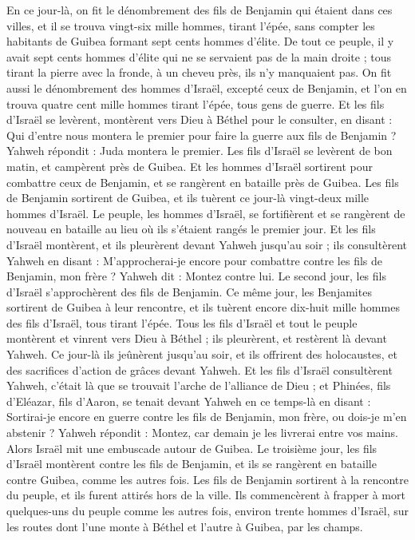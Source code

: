 \begin{multicols}{2}
En ce jour-là, on fit le dénombrement des fils de Benjamin qui étaient dans ces villes, et il se trouva vingt-six mille hommes, tirant l'épée, sans compter les habitants de Guibea formant sept cents hommes d'élite.
De tout ce peuple, il y avait sept cents hommes d'élite qui ne se servaient pas de la main droite ; tous tirant la pierre avec la fronde,  à un cheveu près,  ils n'y manquaient pas.
On fit aussi le dénombrement des hommes d'Israël, excepté ceux de Benjamin, et l'on en trouva quatre cent mille hommes tirant l'épée, tous gens de guerre.
Et les fils d'Israël se levèrent, montèrent vers Dieu à Béthel pour le consulter, en disant : Qui d'entre nous montera le premier pour faire la guerre aux fils de Benjamin ? Yahweh répondit : Juda montera le premier.
Les fils d'Israël se levèrent de bon matin, et campèrent près de Guibea.
Et les hommes d'Israël sortirent pour combattre ceux de Benjamin, et se rangèrent en bataille près de Guibea.
Les fils de Benjamin sortirent de Guibea, et ils tuèrent ce jour-là vingt-deux mille hommes d'Israël.
Le peuple, les hommes d'Israël, se fortifièrent et se rangèrent de nouveau en bataille au lieu où ils s'étaient rangés le premier jour.
Et les fils d'Israël montèrent, et ils pleurèrent devant Yahweh jusqu'au soir ; ils consultèrent Yahweh en disant : M'approcherai-je encore pour combattre contre les fils de Benjamin, mon frère ? Yahweh dit : Montez contre lui.
Le second jour, les fils d'Israël s'approchèrent des fils de Benjamin.
Ce même jour, les Benjamites sortirent de Guibea à leur rencontre, et ils tuèrent encore dix-huit mille hommes des fils d'Israël, tous tirant l'épée.
Tous les fils d'Israël et tout le peuple montèrent et vinrent vers Dieu à Béthel ; ils pleurèrent, et restèrent là devant Yahweh. Ce jour-là ils jeûnèrent jusqu'au soir, et ils offrirent des holocaustes, et des sacrifices d'action de grâces devant Yahweh.
Et les fils d'Israël consultèrent Yahweh, c'était là que se trouvait l'arche de l'alliance de Dieu ;
et Phinées, fils d'Eléazar, fils d'Aaron, se tenait devant Yahweh en ce temps-là en disant : Sortirai-je encore en guerre contre les fils de Benjamin, mon frère, ou dois-je m'en abstenir ? Yahweh répondit : Montez, car demain je les livrerai entre vos mains.
Alors Israël mit une embuscade autour de Guibea.
Le troisième jour, les fils d'Israël montèrent contre les fils de Benjamin, et ils se rangèrent en bataille contre Guibea, comme les autres fois.
Les fils de Benjamin sortirent à la rencontre du peuple, et ils furent attirés hors de la ville. Ils commencèrent à frapper à mort quelques-uns du peuple comme les autres fois, environ trente hommes d'Israël, sur les routes dont l'une monte à Béthel et l'autre à Guibea, par les champs.

\end{multicols}

